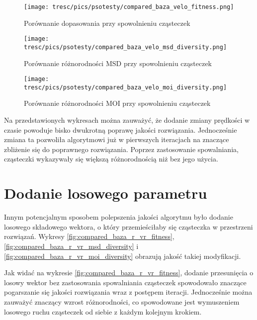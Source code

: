 \begin{figure}[H]
\begin{center} 
\texttt{[image: tresc/pics/psotesty/compared\_baza\_velo\_fitness.png]}
\caption{Porównanie dopasowania przy spowolnieniu cząsteczek}
\label{fig:compared_baza_velo_fitness}
\end{center}
\end{figure}

\begin{figure}[H]
\begin{center} 
\texttt{[image: tresc/pics/psotesty/compared\_baza\_velo\_msd\_diversity.png]}
\caption{Porównanie różnorodności MSD przy spowolnieniu cząsteczek}
\label{fig:compared_baza_velo_msd_diversity}
\end{center}
\end{figure}

\begin{figure}[H]
\begin{center} 
\texttt{[image: tresc/pics/psotesty/compared\_baza\_velo\_moi\_diversity.png]}
\caption{Porównanie różnorodności MOI przy spowolnieniu cząsteczek}
\label{fig:compared_baza_velo_moi_diversity}
\end{center}
\end{figure}

Na przedstawionych wykresach można zauważyć, że dodanie zmiany prędkości w czasie powoduje bisko dwukrotną poprawę jakości rozwiązania. Jednocześnie zmiana ta pozwoliła algorytmowi już w pierwszych iteracjach na znaczące zbliżenie się do poprawnego rozwiązania. Poprzez zastosowanie spowalniania, cząsteczki wykazywały się większą różnorodnością niż bez jego użycia.


\section{Dodanie losowego parametru}

Innym potencjalnym sposobem polepszenia jakości algorytmu było dodanie losowego składowego wektora, o który przemieściłaby się cząsteczka w przestrzeni rozwiązań. Wykresy \ref{fig:compared_baza_r_vr_fitness}, \ref{fig:compared_baza_r_vr_msd_diversity} i \ref{fig:compared_baza_r_vr_moi_diversity} obrazują jakość takiej modyfikacji. 

Jak widać na wykresie \ref{fig:compared_baza_r_vr_fitness}, dodanie przesunięcia o losowy wektor bez zastosowania spowalniania cząsteczek spowodowało znaczące pogarszanie się jakości rozwiązania wraz z postępem iteracji. Jednocześnie można zauważyć znaczący wzrost różnorodności, co spowodowane jest wymuszeniem losowego ruchu cząsteczek od siebie z każdym kolejnym krokiem.

